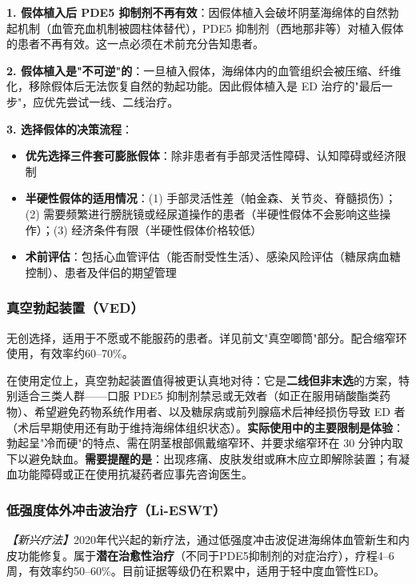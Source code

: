 \begin{tcolorbox}[colback=pink!5!white,colframe=red!50!black,title=贴心小叮咛]
\textbf{1. 假体植入后 PDE5 抑制剂不再有效}：因假体植入会破坏阴茎海绵体的自然勃起机制（血管充血机制被圆柱体替代），PDE5 抑制剂（西地那非等）对植入假体的患者不再有效。这一点必须在术前充分告知患者。

\textbf{2. 假体植入是"不可逆"的}：一旦植入假体，海绵体内的血管组织会被压缩、纤维化，移除假体后无法恢复自然的勃起功能。因此假体植入是 ED 治疗的"最后一步"，应优先尝试一线、二线治疗。

\textbf{3. 选择假体的决策流程}：
\begin{itemize}
	\item \textbf{优先选择三件套可膨胀假体}：除非患者有手部灵活性障碍、认知障碍或经济限制
	\item \textbf{半硬性假体的适用情况}：(1) 手部灵活性差（帕金森、关节炎、脊髓损伤）；(2) 需要频繁进行膀胱镜或经尿道操作的患者（半硬性假体不会影响这些操作）；(3) 经济条件有限（半硬性假体价格较低）
	\item \textbf{术前评估}：包括心血管评估（能否耐受性生活）、感染风险评估（糖尿病血糖控制）、患者及伴侣的期望管理
\end{itemize}
\end{tcolorbox}

\subsubsection{真空勃起装置（VED）}

无创选择，适用于不愿或不能服药的患者。详见前文"真空唧筒"部分。配合缩窄环使用，有效率约60--70\%。


在使用定位上，真空勃起装置值得被更认真地对待：它是\textbf{二线但非末选}的方案，特别适合三类人群——口服 PDE5 抑制剂禁忌或无效者（如正在服用硝酸酯类药物）、希望避免药物系统作用者、以及糖尿病或前列腺癌术后神经损伤导致 ED 者（术后早期使用还有助于维持海绵体组织状态）。\textbf{实际使用中的主要限制是体验}：勃起呈"冷而硬"的特点、需在阴茎根部佩戴缩窄环、并要求缩窄环在 30 分钟内取下以避免缺血。\textbf{需要提醒的是}：出现疼痛、皮肤发绀或麻木应立即解除装置；有凝血功能障碍或正在使用抗凝药者应事先咨询医生。

\subsubsection{低强度体外冲击波治疗（Li-ESWT）}

\textit{【新兴疗法】}2020年代兴起的新疗法，通过低强度冲击波促进海绵体血管新生和内皮功能修复。属于\textbf{潜在治愈性治疗}（不同于PDE5抑制剂的对症治疗），疗程4--6周，有效率约50--60\%。目前证据等级仍在积累中，适用于轻中度血管性ED。


